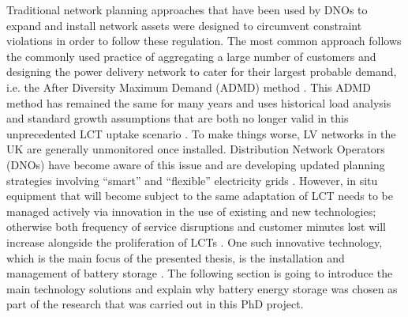 Traditional network planning approaches that have been used by DNOs to expand and install network assets were designed to circumvent constraint violations in order to follow these regulation.
The most common approach follows the commonly used practice of aggregating a large number of customers and designing the power delivery network to cater for their largest probable demand, i.e. the After Diversity Maximum Demand (ADMD) method \cite{Richardson2010a}.
This ADMD method has remained the same for many years and uses historical load analysis and standard growth assumptions that are both no longer valid in this unprecedented LCT uptake scenario \cite{Yunusov2016}.
To make things worse, LV networks in the UK are generally unmonitored once installed.
Distribution Network Operators (DNOs) have become aware of this issue and are developing updated planning strategies involving ``smart'' and ``flexible'' electricity grids \cite{Fang2012}.
However, in situ equipment that will become subject to the same adaptation of LCT needs to be managed actively via innovation in the use of existing and new technologies; otherwise both frequency of service disruptions and customer minutes lost will increase alongside the proliferation of LCTs \cite{Ault2008a}.
%
%
One such innovative technology, which is the main focus of the presented thesis, is the installation and management of battery storage \cite{Chen2009}.
The following section is going to introduce the main technology solutions and explain why battery energy storage was chosen as part of the research that was carried out in this PhD project.


